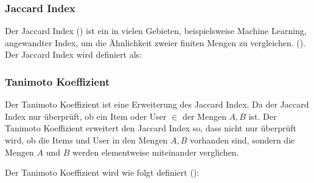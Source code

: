 \subsubsection{Jaccard Index}
Der Jaccard Index (\cite{Jaccard}) ist ein in vielen Gebieten, beispielsweise Machine Learning, angewandter Index, um die Ähnlichkeit zweier finiten Mengen zu vergleichen. (\cite{kotz_balakrishnan_vidakovic_campbell}). Der Jaccard Index wird definiert als: 


\subsubsection{Tanimoto Koeffizient}
Der Tanimoto Koeffizient ist eine Erweiterung des Jaccard Index. Da der Jaccard Index nur überprüft, ob ein Item oder User $\in$ der Mengen $A,B$ ist.
Der Tanimoto Koeffizient erweitert den Jaccard Index so, dass nicht nur überprüft wird, ob die Items und User in den Mengen $A,B$ vorhanden sind, sondern die Mengen $A$ und $B$ werden elementweise miteinander verglichen.

Der Tanimoto Koeffizient wird wie folgt definiert (\cite{Rogers1960}):
